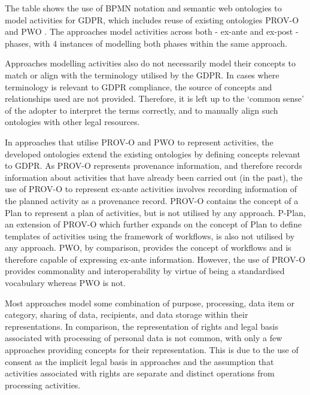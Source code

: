 The table shows the use of BPMN notation and semantic web ontologies to model activities for GDPR, which includes reuse of existing ontologies PROV-O \cite{lebo_prov-o:_2013} and 
PWO \cite{gangemi_publishing_2017}.
The approaches model activities across both - ex-ante and ex-post - phases, with 4 instances of modelling both phases within the same approach.

Approaches modelling activities also do not necessarily model their concepts to match or align with the terminology utilised by the GDPR. In cases where terminology is relevant to GDPR compliance, the source of concepts and relationships used are not provided. Therefore, it is left up to the `common sense' of the adopter to interpret the terms correctly, and to  manually align such ontologies with other legal resources.

In approaches that utilise PROV-O and PWO to represent activities, the developed ontologies extend the existing ontologies by defining concepts relevant to GDPR. As PROV-O represents provenance information, and therefore records information about activities that have already been carried out (in the past), the use of PROV-O to represent ex-ante activities involves recording information of the planned activity as a provenance record. PROV-O contains the concept of a Plan to represent a plan of activities, but is not utilised by any approach. P-Plan, an extension of PROV-O which further expands on the concept of Plan to define templates of activities using the framework of workflows, is also not utilised by any approach. PWO, by comparison, provides the concept of workflows and is therefore capable of expressing ex-ante information. However, the use of PROV-O provides commonality and interoperability by virtue of being a standardised vocabulary whereas PWO is not.

Most approaches model some combination of purpose, processing, data item or category, sharing of data, recipients, and data storage within their representations. In comparison, the representation of rights and legal basis associated with processing of personal data is not common, with only a few approaches providing concepts for their representation. This is due to the use of consent as the implicit legal basis in approaches and the assumption that activities associated with rights are separate and distinct operations from processing activities. 


